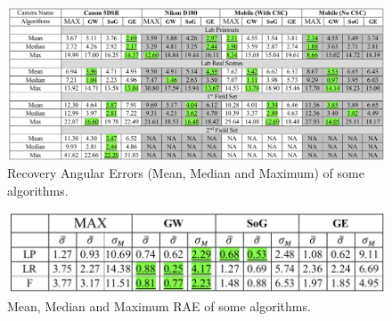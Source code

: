 \begin{figure}[htbp]
    \centering
    \includegraphics[width = 1 \linewidth]{images/paper4/RAEHigh.png}
    \centering
    \caption{Recovery Angular Errors (Mean, Median and Maximum) of some algorithms.}
    \label{fig:RAE}
\end{figure}

\begin{figure}[htbp]
    \centering
    \includegraphics[width = 0.6 \linewidth]{images/paper4/standardHigh.png}
    \centering
    \caption{Mean, Median and Maximum RAE of some algorithms.}
    \label{fig:RAEstandard}
\end{figure}

